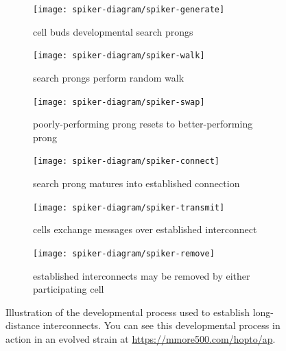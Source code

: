 
\iffalse

\begin{figure}[!htbp]
\begin{center}

\begin{minipage}{\linewidth}
\begin{center}
\begin{subfigure}[t]{0.25\linewidth}
  \texttt{[image: spiker-diagram/spiker-generate]}
  \caption{cell buds developmental search prongs}
  \label{fig:spiker-generate}
\end{subfigure}
	\hspace{2ex}
\begin{subfigure}[t]{0.25\linewidth}
  \texttt{[image: spiker-diagram/spiker-walk]}
  \caption{search prongs perform random walk}
  \label{fig:spiker-walk}
\end{subfigure}
  \hspace{2ex}
\begin{subfigure}[t]{0.25\linewidth}
  \texttt{[image: spiker-diagram/spiker-swap]}
  \caption{poorly-performing prong resets to better-performing prong}
  \label{fig:spiker-swap}
\end{subfigure}
\end{center}
\end{minipage}

\begin{minipage}{\linewidth}
\begin{center}
\begin{subfigure}[t]{0.25\linewidth}
  \texttt{[image: spiker-diagram/spiker-connect]}
  \caption{search prong matures into established connection}
  \label{fig:spiker-connect}
\end{subfigure}
  \hspace{2ex}
\begin{subfigure}[t]{0.25\linewidth}
  \texttt{[image: spiker-diagram/spiker-transmit]}
  \caption{cells exchange messages over established interconnect}
  \label{fig:spiker-transmit}
\end{subfigure}
   \hspace{2ex}
\begin{subfigure}[t]{0.25\linewidth}
  \texttt{[image: spiker-diagram/spiker-remove]}
  \caption{established interconnects may be removed by either participating cell}
  \label{fig:spiker-remove}
\end{subfigure}
\end{center}
\end{minipage}

\caption{
Illustration of the developmental process used to establish long-distance interconnects.
You can see this developmental process in action in an evolved strain at \url{https://mmore500.com/hopto/ap}.
}
\label{fig:spiker_diagram}
\end{center}
\end{figure}

